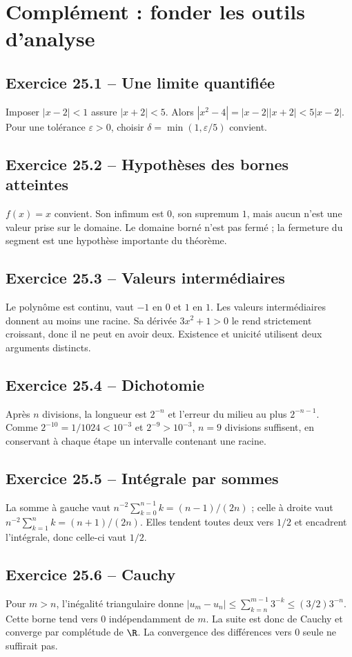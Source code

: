\chapter{Complément : fonder les outils d'analyse}
\section*{Exercice 25.1 -- Une limite quantifiée}
Imposer $|x-2|<1$ assure $|x+2|<5$. Alors $|x^2-4|=|x-2||x+2|<5|x-2|$. Pour une tolérance $\varepsilon>0$, choisir $\delta=\min(1,\varepsilon/5)$ convient.

\section*{Exercice 25.2 -- Hypothèses des bornes atteintes}
$f(x)=x$ convient. Son infimum est $0$, son supremum $1$, mais aucun n'est une valeur prise sur le domaine. Le domaine borné n'est pas fermé ; la fermeture du segment est une hypothèse importante du théorème.

\section*{Exercice 25.3 -- Valeurs intermédiaires}
Le polynôme est continu, vaut $-1$ en $0$ et $1$ en $1$. Les valeurs intermédiaires donnent au moins une racine. Sa dérivée $3x^2+1>0$ le rend strictement croissant, donc il ne peut en avoir deux. Existence et unicité utilisent deux arguments distincts.

\section*{Exercice 25.4 -- Dichotomie}
Après $n$ divisions, la longueur est $2^{-n}$ et l'erreur du milieu au plus $2^{-n-1}$. Comme $2^{-10}=1/1024<10^{-3}$ et $2^{-9}>10^{-3}$, $n=9$ divisions suffisent, en conservant à chaque étape un intervalle contenant une racine.

\section*{Exercice 25.5 -- Intégrale par sommes}
La somme à gauche vaut $n^{-2}\sum_{k=0}^{n-1}k=(n-1)/(2n)$ ; celle à droite vaut $n^{-2}\sum_{k=1}^nk=(n+1)/(2n)$. Elles tendent toutes deux vers $1/2$ et encadrent l'intégrale, donc celle-ci vaut $1/2$.

\section*{Exercice 25.6 -- Cauchy}
Pour $m>n$, l'inégalité triangulaire donne $|u_m-u_n|\le\sum_{k=n}^{m-1}3^{-k}\le(3/2)3^{-n}$. Cette borne tend vers $0$ indépendamment de $m$. La suite est donc de Cauchy et converge par complétude de $\R$. La convergence des différences vers $0$ seule ne suffirait pas.
